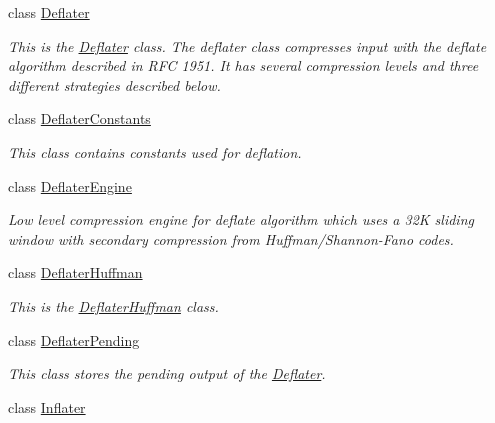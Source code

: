 \begin{DoxyCompactItemize}
\item 
class \hyperlink{class_i_c_sharp_code_1_1_sharp_zip_lib_1_1_zip_1_1_compression_1_1_deflater}{Deflater}
\begin{DoxyCompactList}\small\item\em This is the \hyperlink{class_i_c_sharp_code_1_1_sharp_zip_lib_1_1_zip_1_1_compression_1_1_deflater}{Deflater} class. The deflater class compresses input with the deflate algorithm described in R\+FC 1951. It has several compression levels and three different strategies described below. \end{DoxyCompactList}\item 
class \hyperlink{class_i_c_sharp_code_1_1_sharp_zip_lib_1_1_zip_1_1_compression_1_1_deflater_constants}{Deflater\+Constants}
\begin{DoxyCompactList}\small\item\em This class contains constants used for deflation. \end{DoxyCompactList}\item 
class \hyperlink{class_i_c_sharp_code_1_1_sharp_zip_lib_1_1_zip_1_1_compression_1_1_deflater_engine}{Deflater\+Engine}
\begin{DoxyCompactList}\small\item\em Low level compression engine for deflate algorithm which uses a 32K sliding window with secondary compression from Huffman/\+Shannon-\/\+Fano codes. \end{DoxyCompactList}\item 
class \hyperlink{class_i_c_sharp_code_1_1_sharp_zip_lib_1_1_zip_1_1_compression_1_1_deflater_huffman}{Deflater\+Huffman}
\begin{DoxyCompactList}\small\item\em This is the \hyperlink{class_i_c_sharp_code_1_1_sharp_zip_lib_1_1_zip_1_1_compression_1_1_deflater_huffman}{Deflater\+Huffman} class. \end{DoxyCompactList}\item 
class \hyperlink{class_i_c_sharp_code_1_1_sharp_zip_lib_1_1_zip_1_1_compression_1_1_deflater_pending}{Deflater\+Pending}
\begin{DoxyCompactList}\small\item\em This class stores the pending output of the \hyperlink{class_i_c_sharp_code_1_1_sharp_zip_lib_1_1_zip_1_1_compression_1_1_deflater}{Deflater}. \end{DoxyCompactList}\item 
class \hyperlink{class_i_c_sharp_code_1_1_sharp_zip_lib_1_1_zip_1_1_compression_1_1_inflater}{Inflater}

\end{DoxyCompactItemize}
